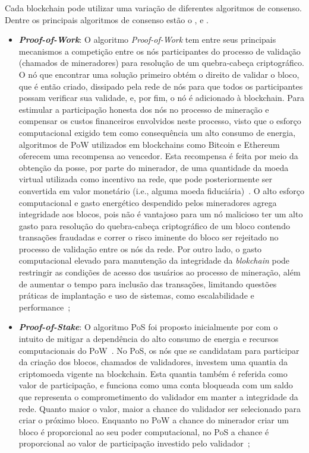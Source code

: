 Cada blockchain pode utilizar uma variação de diferentes algoritmos de consenso. Dentre os principais algoritmos de consenso estão o ,  e .

\begin{itemize}
    \item \textbf{\textit{Proof-of-Work}}: O algoritmo \textit{Proof-of-Work} tem entre seus principais mecanismos a competição entre os nós participantes do processo de validação (chamados de mineradores) para resolução de um quebra-cabeça criptográfico. O nó que encontrar uma solução primeiro obtém o direito de validar o bloco, que é então criado, dissipado pela rede de nós para que todos os participantes possam verificar sua validade, e, por fim, o nó é adicionado à blockchain. Para estimular a participação honesta dos nós no processo de mineração e compensar os custos financeiros envolvidos neste processo, visto que o esforço computacional exigido tem como consequência um alto consumo de energia, algoritmos de PoW utilizados em blockchains como Bitcoin e Ethereum oferecem uma recompensa ao vencedor. Esta recompensa é feita por meio da obtenção da posse, por parte do minerador, de uma quantidade da moeda virtual utilizada como incentivo na rede, que pode posteriormente ser convertida em valor monetário (i.e., alguma moeda fiduciária)~\cite{overview-bitcoin2008nakamoto, ethereum2014whitepaper, overview-blockchainbasic2018drescher}. O alto esforço computacional e gasto energético despendido pelos mineradores agrega integridade aos blocos, pois não é vantajoso para um nó malicioso ter um alto gasto para resolução do quebra-cabeça criptográfico de um bloco contendo transações fraudadas e correr o risco iminente do bloco ser rejeitado no processo de validação entre os nós da rede. Por outro lado, o gasto computacional elevado para manutenção da integridade da \textit{blokchain} pode restringir as condições de acesso dos usuários ao processo de mineração, além de aumentar o tempo para inclusão das transações, limitando questões práticas de implantação e uso de sistemas, como escalabilidade e performance~\cite{consenso-Bouraga2021};
    \item \textbf{\textit{Proof-of-Stake}}: O algoritmo PoS foi proposto inicialmente por  com o intuito de mitigar a dependência do alto consumo de energia e recursos computacionais do PoW~\cite{overview-bitcoin-energy2014}. No PoS, os nós que se candidatam para participar da criação dos blocos, chamados de validadores, investem uma quantia da criptomoeda vigente na blockchain. Esta quantia também é referida como valor de participação, e funciona como uma conta bloqueada com um saldo que representa o comprometimento do validador em manter a integridade da rede. Quanto maior o valor, maior a chance do validador ser selecionado para criar o próximo bloco. Enquanto no PoW a chance do minerador criar um bloco é proporcional ao seu poder computacional, no PoS a chance é proporcional ao valor de participação investido pelo validador~\cite{consenso-xiao-2020, overview-dinh-2018}; 

\end{itemize}
